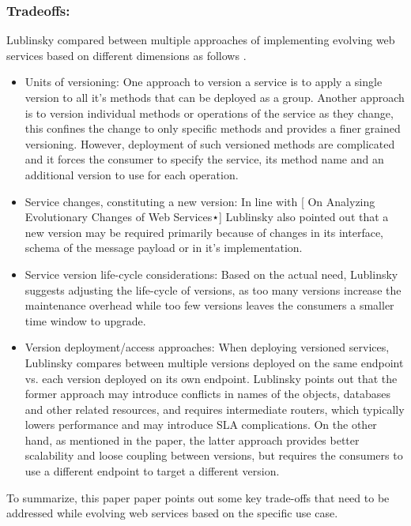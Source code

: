 \documentclass[runningheads,a4paper]{llncs}
\begin{document}
\subsubsection{Tradeoffs:} %
Lublinsky compared between multiple approaches of implementing evolving web services based on different dimensions as follows \cite{lublinsky2007versioning}.

\begin{itemize}

  \item Units of versioning: One approach to version a service is to apply a single version to all it’s methods that can be deployed as a group. Another approach is to version individual methods or operations of the service as they change, this confines the change to only specific methods and provides a finer grained versioning. However, deployment of such versioned methods are complicated and it forces the consumer to specify the service, its method name and an additional version to use for each operation.
  \item Service changes, constituting a new version: In line with [ On Analyzing Evolutionary Changes of Web Services⋆]  Lublinsky also pointed out that a new version may be required primarily because of changes in its interface, schema of the message payload or in it’s implementation.
  \item Service version life-cycle considerations: Based on the actual need, Lublinsky suggests adjusting the life-cycle of versions, as too many versions increase the maintenance overhead while too few versions leaves the consumers a smaller time window to upgrade.
  \item Version deployment/access approaches: When deploying versioned services, Lublinsky compares between multiple versions deployed on the same endpoint vs. each version deployed on its own endpoint. Lublinsky points out that the former approach may introduce conflicts in names of the objects, databases and other related resources, and requires intermediate routers, which typically lowers performance and may introduce SLA complications. On the other hand, as mentioned in the paper, the latter approach provides better scalability and loose coupling between versions, but requires the consumers to use a different endpoint to target a different version.

\end{itemize}

To summarize, this paper paper points out some key trade-offs that need to be addressed while evolving web services based on the specific use case.
\end{document}
